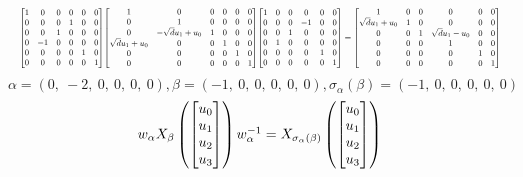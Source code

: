 \documentclass[11pt]{article}
\theoremstyle{definition}
\begin{document}
\[
\scaletoalign{\textwidth}{{\left[\begin{matrix}1 & 0 & 0 & 0 & 0 & 0\\0 & 0 & 0 & 1 & 0 & 0\\0 & 0 & 1 & 0 & 0 & 0\\0 & -1 & 0 & 0 & 0 & 0\\0 & 0 & 0 & 0 & 1 & 0\\0 & 0 & 0 & 0 & 0 & 1\end{matrix}\right]} {\left[\begin{matrix}1 & 0 & 0 & 0 & 0 & 0\\0 & 1 & 0 & 0 & 0 & 0\\0 & - \sqrt{d} u_{1} + u_{0} & 1 & 0 & 0 & 0\\\sqrt{d} u_{1} + u_{0} & 0 & 0 & 1 & 0 & 0\\0 & 0 & 0 & 0 & 1 & 0\\0 & 0 & 0 & 0 & 0 & 1\end{matrix}\right]} {\left[\begin{matrix}1 & 0 & 0 & 0 & 0 & 0\\0 & 0 & 0 & -1 & 0 & 0\\0 & 0 & 1 & 0 & 0 & 0\\0 & 1 & 0 & 0 & 0 & 0\\0 & 0 & 0 & 0 & 1 & 0\\0 & 0 & 0 & 0 & 0 & 1\end{matrix}\right]} = {\left[\begin{matrix}1 & 0 & 0 & 0 & 0 & 0\\\sqrt{d} u_{1} + u_{0} & 1 & 0 & 0 & 0 & 0\\0 & 0 & 1 & \sqrt{d} u_{1} - u_{0} & 0 & 0\\0 & 0 & 0 & 1 & 0 & 0\\0 & 0 & 0 & 0 & 1 & 0\\0 & 0 & 0 & 0 & 0 & 1\end{matrix}\right]}}
\]
\[
\alpha = \left( 0, \  -2, \  0, \  0, \  0, \  0\right), \beta = \left( -1, \  0, \  0, \  0, \  0, \  0\right), \sigma_{\alpha}(\beta) = \left( -1, \  0, \  0, \  0, \  0, \  0\right)
\]
\[
\scaletoalign{\textwidth}{w_{\alpha} X_{\beta}\left(\left[\begin{matrix}u_{0}\\u_{1}\\u_{2}\\u_{3}\end{matrix}\right]\right) w_{\alpha}^{-1} = X_{\sigma_{\alpha}\left(\beta\right)}\left(\left[\begin{matrix}u_{0}\\u_{1}\\u_{2}\\u_{3}\end{matrix}\right]\right)}
\]
\end{document}
